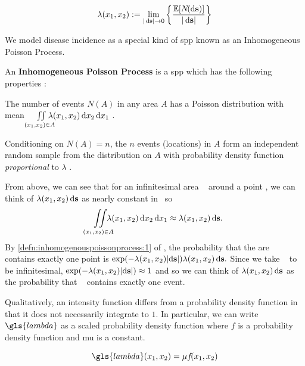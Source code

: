 \begin{equation}
    \label{eq:lambda_differential}
    \lambda \xvec := \lim_{|\ds| \to 0}
        \left\{
            \frac{\mathbb{E}[N\!(\ds)]}%
            {|\ds|}
        \right\}
\end{equation}

We model disease incidence as a special kind of \gls{spp} known as an Inhomogeneous Poisson Process.
\begin{defn}
    \label{defn:inhomogenouspoissonprocess}
    An \textbf{Inhomogeneous Poisson Process} is a \gls{spp} which has the following properties \citep[Section 4.4]{diggle1983spatial}:
    \begin{properties}
        \item The number of events $N\!(A)$ in any area $A$ has a Poisson distribution with mean
            $\iint\limits_{(x_1, x_2) \in A}{\hspace{-1em} \lambda (x_1, x_2) \mathop{}\!\mathrm{d}{x_2} \mathop{}\!\mathrm{d}{x_1}}$
            \label{defn:inhomogenouspoissonprocess:1}.
        \item Conditioning on $N\!(A) \! = \! n$,
            the $n$ events (locations) in $A$ form an independent random sample from the distribution on $A$ with probability density function \textit{proportional} to $\lambda$ \label{defn:inhomogenouspoissonprocess:2}.
    \end{properties}
\end{defn}

From above, we can see that for an infinitesimal area \ds~ around a point \xvec,
we can think of $\lambda (x_1, x_2) \mathop{}\!\mathrm{d}{\mathbf{s}}$ as nearly constant in \ds~so
$$\iint\limits_{(x_1, x_2) \in A}{\hspace{-1em}\lambda (x_1, x_2) \mathop{}\!\mathrm{d}{x_2} \mathop{}\!\mathrm{d}{x_1}} \approx \lambda (x_1, x_2) \mathop{}\!\mathrm{d}{\mathbf{s}} \text{.}$$
By \cref{defn:inhomogenouspoissonprocess:1} of ,
the probability that the are \ds~ contains exactly one point is
$\exp(-\lambda (x_1, x_2) |\!\mathop{}\!\mathrm{d}{\mathbf{s}}|) \lambda (x_1, x_2) \mathop{}\!\mathrm{d}{\mathbf{s}} \text{.}$
Since we take \ds~ to be infinitesimal,
$\exp(-\lambda (x_1, x_2) |\!\mathop{}\!\mathrm{d}{\mathbf{s}}|) \allowbreak \approx 1$ and so we can think of
$\lambda (x_1, x_2) \mathop{}\!\mathrm{d}{\mathbf{s}}$ as the probability that \ds~ contains exactly one event.

Qualitatively,
an intensity function differs from a probability density function in that it does not necessarily integrate to $1$.
In particular, we can write $\gls{lambda}$ as a scaled probability density function
where $f$ is a probability density function and \gls{mu} is a constant.

\begin{equation}
    \label{eq:lambda_mu}
    \gls{lambda}\xvec = \mu f\!\xvec
\end{equation}

